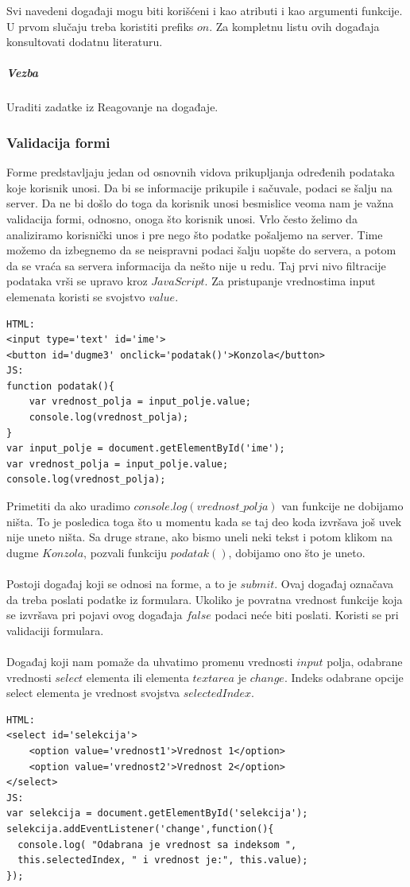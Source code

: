 \documentclass[a4paper]{article}
\begin{document}
Svi navedeni događaji mogu biti korišćeni i kao atributi i kao argumenti funkcije. U prvom slučaju treba koristiti prefiks $on$. Za kompletnu listu ovih događaja konsultovati dodatnu literaturu.

\subparagraph{Vezba} Uraditi zadatke iz Reagovanje na događaje.

\subsubsection{Validacija formi}
Forme predstavljaju jedan od osnovnih vidova prikupljanja određenih podataka koje korisnik unosi. Da bi se informacije prikupile i sačuvale, podaci se šalju na server. Da ne bi došlo do toga da korisnik unosi besmislice veoma nam je važna validacija formi, odnosno, onoga što korisnik unosi.
Vrlo često želimo da analiziramo korisnički unos i pre nego što podatke pošaljemo na server. Time možemo da izbegnemo da se neispravni podaci šalju uopšte do servera, a potom da se vraća sa servera informacija da nešto nije u redu. Taj prvi nivo filtracije podataka vrši se upravo kroz $JavaScript$. Za pristupanje vrednostima input elemenata koristi se svojstvo $value$.
\begin{lstlisting}[backgroundcolor = \color{lightgray}]
HTML:
<input type='text' id='ime'>
<button id='dugme3' onclick='podatak()'>Konzola</button>
JS:
function podatak(){
	var vrednost_polja = input_polje.value;
	console.log(vrednost_polja);    
}
var input_polje = document.getElementById('ime');
var vrednost_polja = input_polje.value;
console.log(vrednost_polja);
\end{lstlisting}
Primetiti da ako uradimo $console.log(vrednost\_polja)$ van funkcije ne dobijamo ništa. To je posledica toga što u momentu kada se taj deo koda izvršava još uvek nije uneto ništa. Sa druge strane, ako bismo uneli neki tekst i potom klikom na dugme $Konzola$, pozvali funkciju $podatak()$, dobijamo ono što je uneto.\\\\

Postoji događaj koji se odnosi na forme, a to je $submit$. Ovaj događaj označava da treba poslati podatke iz formulara. Ukoliko je povratna vrednost funkcije koja se izvršava pri pojavi ovog događaja $false$ podaci neće biti poslati. Koristi se pri validaciji
formulara. \\\\

Događaj koji nam pomaže da uhvatimo promenu vrednosti $input$ polja, odabrane vrednosti $select$ elementa ili elementa $textarea$ je $change$. Indeks odabrane opcije select elementa je vrednost svojstva $selectedIndex$.
\begin{lstlisting}[backgroundcolor = \color{lightgray}]
HTML:
<select id='selekcija'>
	<option value='vrednost1'>Vrednost 1</option>
    <option value='vrednost2'>Vrednost 2</option>
</select>
JS:
var selekcija = document.getElementById('selekcija');
selekcija.addEventListener('change',function(){     
  console.log( "Odabrana je vrednost sa indeksom ",
  this.selectedIndex, " i vrednost je:", this.value);
});
\end{lstlisting}
 
\end{document}
